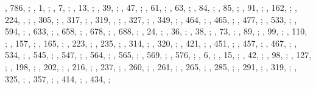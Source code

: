 \begin{autindex}
    , 786, ;
    ,   1, ;
    ,   7, ;
    ,  13, ;
    ,  39, ;
    ,  47, ;
    ,  61, ;
    ,  63, ;
    ,  84, ;
    ,  85, ;
    ,  91, ;
    , 162, ;
    , 224, , ;
    , 305, ;
    , 317, ;
    , 319, , ;
    , 327, ;
    , 349, ;
    , 464, ;
    , 465, ;
    , 477, ;
    , 533, ;
    , 594, ;
    , 633, ;
    , 658, ;
    , 678, ;
    , 688, ;
    ,  24, ;
    ,  36, ;
    ,  38, ;
    ,  73, ;
    ,  89, ;
    ,  99, ;
    , 110, ;
    , 157, ;
    , 165, ;
    , 223, ;
    , 235, ;
    , 314, ;
    , 320, ;
    , 421, ;
    , 451, ;
    , 457, ;
    , 467, ;
    , 534, ;
    , 545, ;
    , 547, ;
    , 564, ;
    , 565, ;
    , 569, ;
    , 576, ;
    ,   6, ;
    ,  15, ;
    ,  42, ;
    ,  98, ;
    , 127, ;
    , 198, ;
    , 202, ;
    , 216, ;
    , 237, ;
    , 260, ;
    , 261, ;
    , 265, ;
    , 285, ;
    , 291, ;
    , 319, ;
    , 325, ;
    , 357, ;
    , 414, ;
    , 434, ;

\end{autindex}
